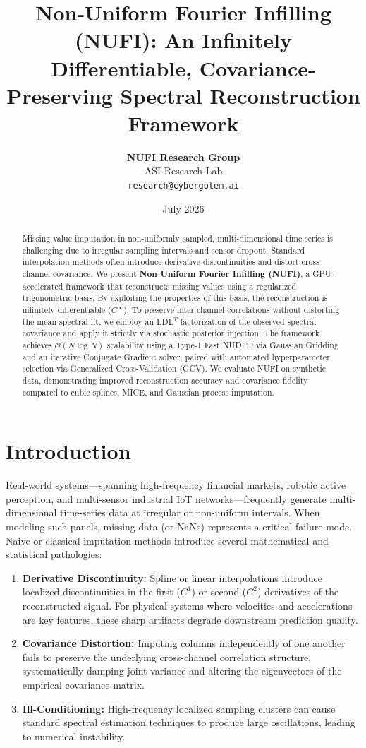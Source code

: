 \documentclass[11pt,a4paper]{article}
\title{\textbf{Non-Uniform Fourier Infilling (NUFI): An Infinitely Differentiable, Covariance-Preserving Spectral Reconstruction Framework}}
\author{\textbf{NUFI Research Group} \\ ASI Research Lab \\ \texttt{research@cybergolem.ai}}
\date{July 2026}
\begin{document}
\maketitle

\begin{abstract}
Missing value imputation in non-uniformly sampled, multi-dimensional time series is challenging due to irregular sampling intervals and sensor dropout. Standard interpolation methods often introduce derivative discontinuities and distort cross-channel covariance. We present \textbf{Non-Uniform Fourier Infilling (NUFI)}, a GPU-accelerated framework that reconstructs missing values using a regularized trigonometric basis. By exploiting the properties of this basis, the reconstruction is infinitely differentiable ($C^\infty$). To preserve inter-channel correlations without distorting the mean spectral fit, we employ an LDL$^T$ factorization of the observed spectral covariance and apply it strictly via stochastic posterior injection. The framework achieves $\mathcal{O}(N \log N)$ scalability using a Type-1 Fast NUDFT via Gaussian Gridding and an iterative Conjugate Gradient solver, paired with automated hyperparameter selection via Generalized Cross-Validation (GCV). We evaluate NUFI on synthetic data, demonstrating improved reconstruction accuracy and covariance fidelity compared to cubic splines, MICE, and Gaussian process imputation.
\end{abstract}

\section{Introduction}
Real-world systems—spanning high-frequency financial markets, robotic active perception, and multi-sensor industrial IoT networks—frequently generate multi-dimensional time-series data at irregular or non-uniform intervals. When modeling such panels, missing data (or NaNs) represents a critical failure mode. Naive or classical imputation methods introduce several mathematical and statistical pathologies:
\begin{enumerate}
    \item \textbf{Derivative Discontinuity:} Spline or linear interpolations introduce localized discontinuities in the first ($C^1$) or second ($C^2$) derivatives of the reconstructed signal. For physical systems where velocities and accelerations are key features, these sharp artifacts degrade downstream prediction quality.
    \item \textbf{Covariance Distortion:} Imputing columns independently of one another fails to preserve the underlying cross-channel correlation structure, systematically damping joint variance and altering the eigenvectors of the empirical covariance matrix.
    \item \textbf{Ill-Conditioning:} High-frequency localized sampling clusters can cause standard spectral estimation techniques \cite{Lomb1976, Scargle1982} to produce large oscillations, leading to numerical instability.
\end{enumerate}
\end{document}
